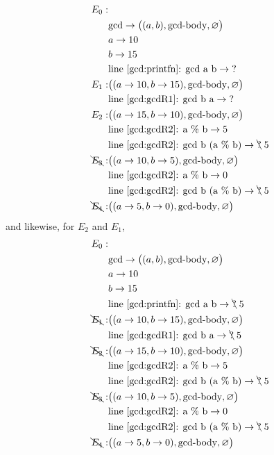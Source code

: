 \documentclass[fsharpnotes.tex]{subfiles}
\begin{document}
\begin{align*}
  E_0:&\\
      & \text{gcd} \rightarrow \big((a, b), \text{gcd-body}, \varnothing\big)\\
      & a \rightarrow 10\\
      & b \rightarrow 15\\
      & \text{line~\ref{gcd:printfn}: gcd a b} \rightarrow \text{?}\\
  E_1:& \big((a \rightarrow 10, b \rightarrow 15), \text{gcd-body}, \varnothing\big)\\
      & \text{line~\ref{gcd:gcdR1}: gcd b a} \rightarrow \text{?}\\
  E_2:& \big((a \rightarrow 15, b \rightarrow 10), \text{gcd-body}, \varnothing\big)\\
      & \text{line~\ref{gcd:gcdR2}: a \% b} \rightarrow 5\\
      & \text{line~\ref{gcd:gcdR2}: gcd b (a \% b)} \rightarrow \bcancel{\text{?}}\; 5\\
  \bcancel{E_3}:& \big((a \rightarrow 10, b \rightarrow 5), \text{gcd-body}, \varnothing\big)\\
      & \text{line~\ref{gcd:gcdR2}: a \% b} \rightarrow 0\\
      & \text{line~\ref{gcd:gcdR2}: gcd b (a \% b)} \rightarrow \bcancel{\text{?}}\; 5\\
  \bcancel{E_4}:& \big((a \rightarrow 5, b \rightarrow 0), \text{gcd-body}, \varnothing\big)\\
\end{align*}
and likewise, for $E_2$ and $E_1$,
\begin{align*}
  E_0:&\\
      & \text{gcd} \rightarrow \big((a, b), \text{gcd-body}, \varnothing\big)\\
      & a \rightarrow 10\\
      & b \rightarrow 15\\
      & \text{line~\ref{gcd:printfn}: gcd a b} \rightarrow \bcancel{\text{?}}\; 5\\
  \bcancel{E_1}:& \big((a \rightarrow 10, b \rightarrow 15), \text{gcd-body}, \varnothing\big)\\
      & \text{line~\ref{gcd:gcdR1}: gcd b a} \rightarrow \bcancel{\text{?}}\; 5\\
  \bcancel{E_2}:& \big((a \rightarrow 15, b \rightarrow 10), \text{gcd-body}, \varnothing\big)\\
      & \text{line~\ref{gcd:gcdR2}: a \% b} \rightarrow 5\\
      & \text{line~\ref{gcd:gcdR2}: gcd b (a \% b)} \rightarrow \bcancel{\text{?}}\; 5\\
  \bcancel{E_3}:& \big((a \rightarrow 10, b \rightarrow 5), \text{gcd-body}, \varnothing\big)\\
      & \text{line~\ref{gcd:gcdR2}: a \% b} \rightarrow 0\\
      & \text{line~\ref{gcd:gcdR2}: gcd b (a \% b)} \rightarrow \bcancel{\text{?}}\; 5\\
  \bcancel{E_4}:& \big((a \rightarrow 5, b \rightarrow 0), \text{gcd-body}, \varnothing\big)\\
\end{align*}
\end{document}
